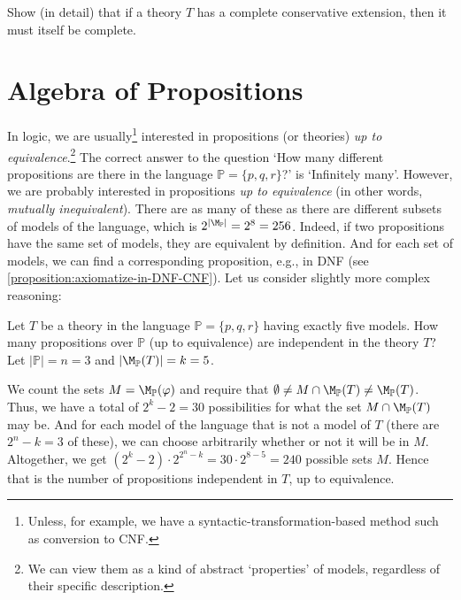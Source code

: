 \begin{exercise}
    Show (in detail) that if a theory $T$ has a complete conservative extension, then it must itself be complete.
\end{exercise}


\section{Algebra of Propositions}

In logic, we are usually\footnote{Unless, for example, we have a syntactic-transformation-based method such as conversion to CNF.} interested in propositions (or theories) \emph{up to equivalence}.\footnote{We can view them as a kind of abstract `properties' of models, regardless of their specific description.} The correct answer to the question `How many different propositions are there in the language $\mathbb{P} = \{p, q, r\}$?' is `Infinitely many'. However, we are probably interested in propositions \emph{up to equivalence} (in other words, \emph{mutually inequivalent}). There are as many of these as there are different subsets of models of the language, which is $2^{|\M_\mathbb{P}|} = 2^8 = 256$. Indeed, if two propositions have the same set of models, they are equivalent by definition. And for each set of models, we can find a corresponding proposition, e.g., in DNF (see \ref{proposition:axiomatize-in-DNF-CNF}). Let us consider slightly more complex reasoning:

\begin{example}
    Let $T$ be a theory in the language $\mathbb{P} = \{p, q, r\}$ having exactly five models. How many propositions over $\mathbb{P}$ (up to equivalence) are independent in the theory $T$? Let $|\mathbb{P}| = n = 3$ and $|\M_\mathbb{P}(T)| = k = 5$.

    We count the sets $M = \M_\mathbb{P}(\varphi)$ and require that $\emptyset \neq M \cap \M_\mathbb{P}(T) \neq \M_\mathbb{P}(T)$. Thus, we have a total of $2^k - 2 = 30$ possibilities for what the set $M \cap \M_\mathbb{P}(T)$ may be. And for each model of the language that is not a model of $T$ (there are $2^n - k = 3$ of these), we can choose arbitrarily whether or not it will be in $M$. Altogether, we get $(2^k - 2) \cdot 2^{2^n - k} = 30 \cdot 2^{8 - 5} = 240$ possible sets $M$. Hence that is the number of propositions independent in $T$, up to equivalence.
\end{example}

